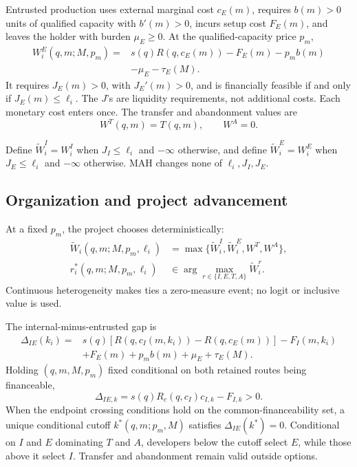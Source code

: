 \documentclass[11pt]{article}
\begin{document}
Entrusted production uses external marginal cost \(c_E(m)\), requires
\(b(m)>0\) units of qualified capacity with \(b'(m)>0\), incurs setup cost
\(F_E(m)\), and leaves the holder with burden \(\mu_E\geq0\). At the
qualified-capacity price \(p_m\),
\begin{equation}
  \begin{aligned}
  W_i^E(q,m;M,p_m)
  ={}&
  s(q)R\!\left(q,c_E(m)\right)-F_E(m)-p_mb(m)\\
  &-\mu_E-\tau_E(M).
  \end{aligned}
  \label{eq:p16m-entrusted}
\end{equation}
It requires \(J_E(m)>0\), with \(J_E'(m)>0\), and is financially feasible if
and only if \(J_E(m)\leq\ell_i\). The \(J\)'s are liquidity requirements, not
additional costs. Each monetary cost enters once. The transfer and abandonment values are
\begin{equation}
  W^T(q,m)=T(q,m),
  \qquad
  W^A=0.
  \label{eq:p16m-outside}
\end{equation}

Define \(\widetilde W_i^I=W_i^I\) when \(J_I\leq\ell_i\) and
\(-\infty\) otherwise, and define
\(\widetilde W_i^E=W_i^E\) when \(J_E\leq\ell_i\) and \(-\infty\) otherwise.
MAH changes none of \(\ell_i,J_I,J_E\).

\subsection{Organization and project advancement}
\label{subsec:p16m-organization}

At a fixed \(p_m\), the project chooses deterministically:
\begin{equation}
  \begin{aligned}
  \widetilde W_i(q,m;M,p_m,\ell_i)
  &=
  \max\{\widetilde W_i^I,\widetilde W_i^E,W^T,W^A\},\\
  r_i^*(q,m;M,p_m,\ell_i)
  &\in
  \arg\max_{r\in\{I,E,T,A\}} \widetilde W_i^r.
  \end{aligned}
  \label{eq:p16m-route-choice}
\end{equation}
Continuous heterogeneity makes ties a zero-measure event; no logit or
inclusive value is used.

The internal-minus-entrusted gap is
\begin{equation}
  \begin{aligned}
  \Delta_{IE}(k_i)
  ={}&
  s(q)\!\left[
  R\!\left(q,c_I(m,k_i)\right)-R\!\left(q,c_E(m)\right)
  \right]-F_I(m,k_i)\\
  &+F_E(m)+p_mb(m)+\mu_E+\tau_E(M).
  \end{aligned}
  \label{eq:p16m-gap}
\end{equation}
Holding \((q,m,M,p_m)\) fixed conditional on both retained routes being
financeable,
\[
  \Delta_{IE,k}
  =
  s(q)R_c\!\left(q,c_I\right)c_{I,k}-F_{I,k}>0.
\]
When the endpoint crossing conditions hold on the common-financeability set, a unique conditional cutoff
\(k^*(q,m;p_m,M)\) satisfies \(\Delta_{IE}(k^*)=0\). Conditional on \(I\)
and \(E\) dominating \(T\) and \(A\), developers below the cutoff select
\(E\), while those above it select \(I\). Transfer and abandonment remain
valid outside options.
\end{document}

